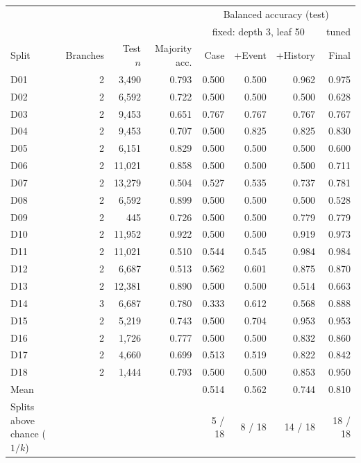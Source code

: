 \begin{tabular}{lrrrrrrr}
\hline
 & & & & \multicolumn{4}{c}{Balanced accuracy (test)} \\
 & & & & \multicolumn{3}{c}{fixed: depth 3, leaf 50} & tuned \\
Split & Branches & Test $n$ & Majority acc. & Case & +Event & +History & Final \\
\hline
D01 & 2 & 3,490 & 0.793 & 0.500 & 0.500 & 0.962 & 0.975 \\
D02 & 2 & 6,592 & 0.722 & 0.500 & 0.500 & 0.500 & 0.628 \\
D03 & 2 & 9,453 & 0.651 & 0.767 & 0.767 & 0.767 & 0.767 \\
D04 & 2 & 9,453 & 0.707 & 0.500 & 0.825 & 0.825 & 0.830 \\
D05 & 2 & 6,151 & 0.829 & 0.500 & 0.500 & 0.500 & 0.600 \\
D06 & 2 & 11,021 & 0.858 & 0.500 & 0.500 & 0.500 & 0.711 \\
D07 & 2 & 13,279 & 0.504 & 0.527 & 0.535 & 0.737 & 0.781 \\
D08 & 2 & 6,592 & 0.899 & 0.500 & 0.500 & 0.500 & 0.528 \\
D09 & 2 & 445 & 0.726 & 0.500 & 0.500 & 0.779 & 0.779 \\
D10 & 2 & 11,952 & 0.922 & 0.500 & 0.500 & 0.919 & 0.973 \\
D11 & 2 & 11,021 & 0.510 & 0.544 & 0.545 & 0.984 & 0.984 \\
D12 & 2 & 6,687 & 0.513 & 0.562 & 0.601 & 0.875 & 0.870 \\
D13 & 2 & 12,381 & 0.890 & 0.500 & 0.500 & 0.514 & 0.663 \\
D14 & 3 & 6,687 & 0.780 & 0.333 & 0.612 & 0.568 & 0.888 \\
D15 & 2 & 5,219 & 0.743 & 0.500 & 0.704 & 0.953 & 0.953 \\
D16 & 2 & 1,726 & 0.777 & 0.500 & 0.500 & 0.832 & 0.860 \\
D17 & 2 & 4,660 & 0.699 & 0.513 & 0.519 & 0.822 & 0.842 \\
D18 & 2 & 1,444 & 0.793 & 0.500 & 0.500 & 0.853 & 0.950 \\
\hline
Mean & & & & 0.514 & 0.562 & 0.744 & 0.810 \\
Splits above chance ($1/k$) & & & & 5 / 18 & 8 / 18 & 14 / 18 & 18 / 18 \\
\hline
\end{tabular}
